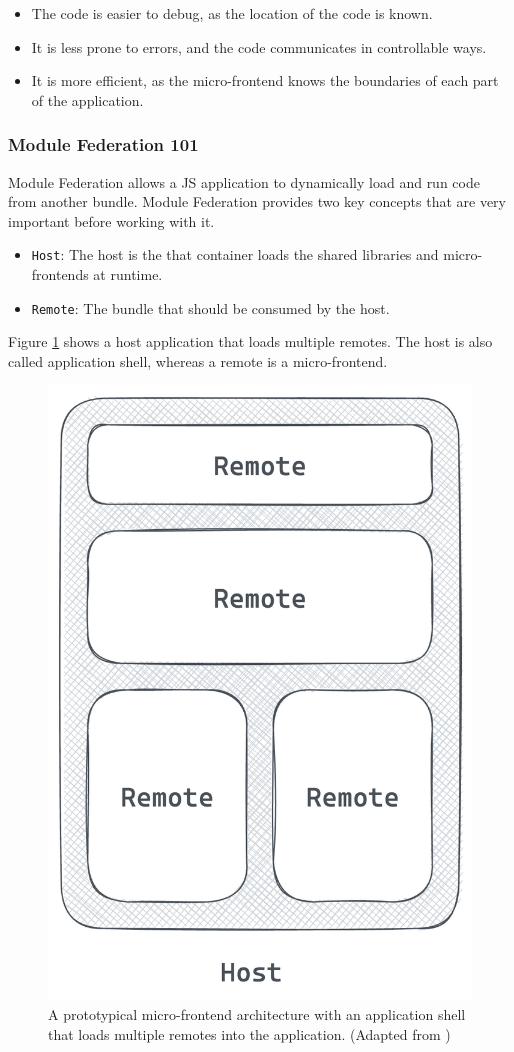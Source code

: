 \begin{itemize}
  \item The code is easier to debug, as the location of the code is known.
  \item It is less prone to errors, and the code communicates in controllable ways.
  \item It is more efficient, as the micro-frontend knows the boundaries of each part of the application.
\end{itemize}

\subsubsection{Module Federation 101}\label{subsubsection:background:micro-frontend:module-federation:101}

Module Federation allows a \ac{JS} application to dynamically load and run code from another bundle. Module Federation provides two key concepts that are very important before working with it. \cite[118-119]{book:2021:mezzalira:applied-methods:building-micro-frontends}

\begin{itemize}
    \item \texttt{Host}: The host is the that container loads the shared libraries and micro-frontends at runtime.
    \item \texttt{Remote}: The bundle that should be consumed by the host.
\end{itemize}

\noindent Figure \ref{fig:background:micro-frontend:module-federation:module-federation-architecture} shows a host application that loads multiple remotes. The host is also called application shell, whereas a remote is a micro-frontend.

\ifshowImages
\begin{figure}[H]
  \centering
  \includegraphics[width=0.25\linewidth]{images/background/micro-frontends/module-federation/module-federation-architecture.png}
  \caption{A prototypical micro-frontend architecture with an application shell that loads multiple remotes into the application. (Adapted from \cite[119]{book:2021:mezzalira:applied-methods:building-micro-frontends})}\label{fig:background:micro-frontend:module-federation:module-federation-architecture}
\end{figure}
\fi

